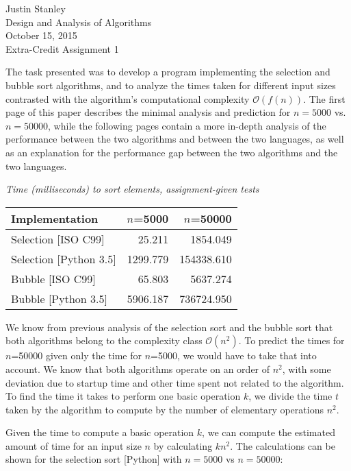 \documentclass{article}
\begin{document}
\noindent Justin Stanley \\
Design and Analysis of Algorithms \\
October 15, 2015 \\
Extra-Credit Assignment 1 \\

\hrulefill

The task presented was to develop a program implementing the selection and bubble sort algorithms, and to analyze the times taken for different input sizes contrasted with the algorithm's computational complexity $\mathcal{O}(f(n))$. The first page of this paper describes the minimal analysis and prediction for $n=5000$ vs. $n=50000$, while the following pages contain a more in-depth analysis of the performance between the two algorithms and between the two languages, as well as an explanation for the performance gap between the two algorithms and the two languages.

\begin{center}
	\textit{Time (milliseconds) to sort elements, assignment-given tests}
	\begin{tabular}{l | r | r}
		Implementation & $n$=5000 & $n$=50000 \\ \hline
		Selection [ISO C99] & 25.211 & 1854.049 \\ \hline
		Selection [Python 3.5] & 1299.779 & 154338.610 \\ \hline
		Bubble [ISO C99] & 65.803 & 5637.274 \\ \hline
		Bubble [Python 3.5] & 5906.187 & 736724.950 \\
	\end{tabular}
\end{center}

We know from previous analysis of the selection sort and the bubble sort that both algorithms belong to the complexity class $\mathcal{O}(n^2)$. To predict the times for $n$=50000 given only the time for $n$=5000, we would have to take that into account. We know that both algorithms operate on an order of $n^2$, with some deviation due to startup time and other time spent not related to the algorithm. To find the time it takes to perform one basic operation $k$, we divide the time $t$ taken by the algorithm to compute by the number of elementary operations $n^2$.

Given the time to compute a basic operation $k$, we can compute the estimated amount of time for an input size $n$ by calculating $kn^2$. The calculations can be shown for the selection sort [Python] with $n=5000$ vs $n=50000$:
\end{document}

